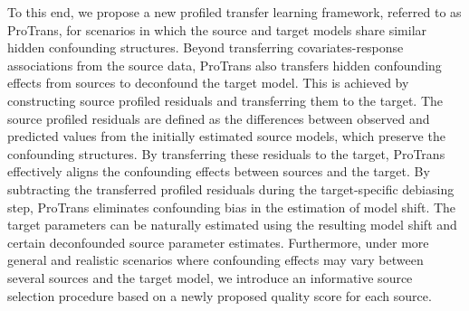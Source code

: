 \documentclass[12pt]{article}
\begin{document}
To this end, we propose a new profiled transfer learning framework, referred to as ProTrans, for scenarios in which the source and target models share similar hidden confounding structures. Beyond transferring covariates-response associations from the source data, ProTrans also transfers hidden confounding effects from sources to deconfound the target model. This is achieved by constructing source profiled residuals and transferring them to the target. The source profiled residuals are defined as the differences between observed and predicted values from the initially estimated source models, which preserve the confounding structures. By transferring these residuals to the target, ProTrans effectively aligns the confounding effects between sources and the target. By subtracting the transferred profiled residuals during the target-specific debiasing step, ProTrans eliminates confounding bias in the estimation of model shift. The target parameters can be naturally estimated using the resulting model shift and certain deconfounded source parameter estimates. Furthermore, under more general and realistic scenarios where confounding effects may vary between several sources and the target model, we introduce an informative source selection procedure based on a newly proposed quality score for each source.  
\end{document}
